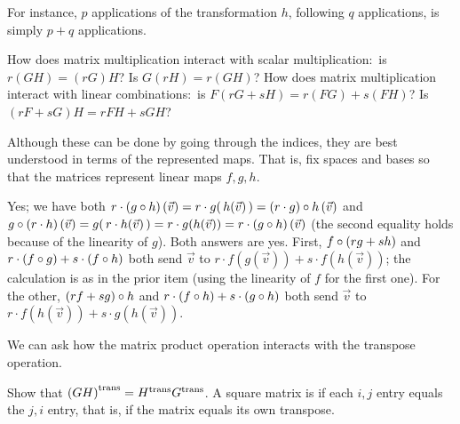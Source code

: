 \begin{exercises}
\begin{answer}
      For instance, $p$ applications of the transformation $h$, following $q$
      applications, is simply $p+q$ applications.
    \end{answer}
  \recommended \item \label{exer:MoreNicePropsMatMult} 
    \begin{exparts}
      \partsitem How does matrix multiplication interact with 
        scalar multiplication:~is \( r(GH)=(rG)H \)?
        Is \( G(rH)=r(GH) \)?
      \partsitem  How does matrix multiplication interact with 
        linear combinations:~is \( F(rG+sH)=r(FG)+s(FH) \)?
        Is $(rF+sG)H=rFH+sGH$?
    \end{exparts}
    \begin{answer}  
      Although these can be done by going through the indices, they
      are best understood in terms of the represented maps.
      That is, fix spaces and bases so that the matrices 
      represent linear maps $f,g,h$.
       \begin{exparts}
        \partsitem Yes;  we have both 
          $r\cdot (g\mathbin\circ h)\,(\vec{v})
           =r\cdot g(\,h(\vec{v})\,)
           =(r\cdot g)\mathbin\circ h\,(\vec{v})$
          and 
          $g\mathbin\circ (r\cdot h)\,(\vec{v})=g(\,r\cdot h(\vec{v})\,)
            =r\cdot g(h(\vec{v}))
            =r\cdot (g\mathbin\circ h)\,(\vec{v})$
          (the second equality holds because of the linearity of $g$).
        \partsitem Both answers are yes.
          First, $f\mathbin\circ (rg+sh)$ and
          $r\cdot(f\mathbin\circ g)+s\cdot(f\mathbin\circ h)$ both send 
          $\vec{v}$ to $r\cdot f(g(\vec{v}))+s\cdot f(h(\vec{v}))$; the
          calculation is as in the prior item
          (using the linearity of $f$ for the first one). 
          For the other, 
          $(rf+sg)\mathbin\circ h$ and 
          $r\cdot(f\mathbin\circ h)+s\cdot(g\mathbin\circ h)$ both send
          $\vec{v}$ to $r\cdot f(h(\vec{v}))+s\cdot g(h(\vec{v}))$.
      \end{exparts}  
    \end{answer}
  \item \label{exer:TranspAndMult} 
    We can ask how the matrix product 
    operation interacts with the transpose operation. 
    \begin{exparts}  
      \partsitem Show that \( {{(GH)}^{\rm trans}}={{H}^{\rm trans}}{{G}^{\rm trans}} \).
      \partsitem A square matrix is 
         if each 
        \( i,j \) entry equals the
        \( j,i \) entry, that is, if the matrix equals its own transpose.

\end{exparts}
\end{exercises}
